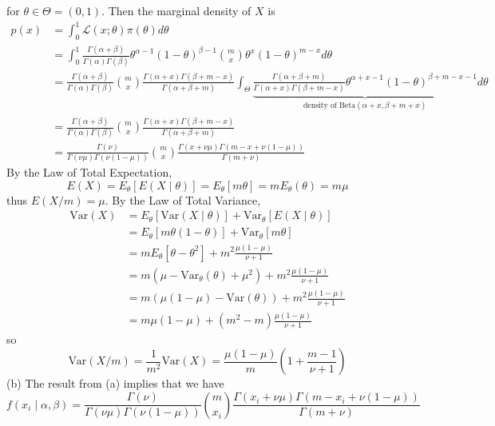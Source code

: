 \documentclass[12pt]{article}
\newcommand{\1}{\mathds 1}
\newcommand{\Var}{\text{Var}}
\begin{document}
\begin{enumerate}
{\begin{equation*}
\end{equation*}
for $\theta \in \Theta = (0, 1)$. 
Then the marginal density of $X$ is 
\small
\begin{align*}
    p(x) &= \int_0^1 \mathcal L(x ; \theta)\pi(\theta) d\theta\\
    &= \int_0^1 \frac{\Gamma(\alpha+\beta)}{\Gamma(\alpha)\Gamma(\beta)} \theta^{\alpha-1}(1-\theta)^{\beta-1} \binom mx \theta^x (1-\theta)^{m-x} d\theta\\
    &= \frac{\Gamma(\alpha+\beta)}{\Gamma(\alpha)\Gamma(\beta)}\binom mx \frac{\Gamma(\alpha+x)\Gamma(\beta+m-x)}{\Gamma(\alpha+\beta+m)} \int_{\Theta}\underbrace{\frac{\Gamma(\alpha+\beta+m)}{\Gamma(\alpha+x)\Gamma(\beta+m-x)} \theta^{\alpha+x-1}(1-\theta)^{\beta+m-x-1}}_{\text{density of Beta}(\alpha+x, \beta+m+x)}d\theta\\
    &= \frac{\Gamma(\alpha+\beta)}{\Gamma(\alpha)\Gamma(\beta)} \binom mx \frac{\Gamma(\alpha+x)\Gamma(\beta+m-x)}{\Gamma(\alpha+\beta+m)}\\
    &= \frac{\Gamma(\nu)}{\Gamma(\nu\mu)\Gamma(\nu(1-\mu))}\binom mx \frac{\Gamma(x+\nu\mu)\Gamma(m-x + \nu(1-\mu))}{\Gamma(m + \nu)}
\end{align*}
\normalsize
By the Law of Total Expectation, 
\begin{equation*}
    E(X) = E_\theta[E(X \mid \theta)] = E_\theta[m\theta] = mE_\theta(\theta) = m \mu
\end{equation*}
thus $E(X / m) = \mu$. By the Law of Total Variance, 
\begin{align*}
    \Var(X) &= E_\theta[\Var(X \mid \theta)] + \Var_\theta[E(X \mid \theta)]\\
    &= E_\theta[m\theta(1-\theta)] + \Var_\theta[m\theta]\\
    &= mE_\theta[\theta - \theta^2] + m^2\frac{\mu(1-\mu)}{\nu + 1}\\
    &= m(\mu - \Var_\theta(\theta) + \mu^2) + m^2\frac{\mu(1-\mu)}{\nu + 1}\\
    &= m(\mu(1-\mu) - \Var(\theta)) + m^2\frac{\mu(1-\mu)}{\nu + 1}\\
    &= m\mu(1-\mu) + (m^2 - m) \frac{\mu(1-\mu)}{\nu + 1}
\end{align*}
so 
\begin{equation*}
    \Var(X/m) = \frac{1}{m^2} \Var(X) = \frac{\mu(1-\mu)}{m}\left( 1 + \frac{m-1}{\nu + 1}\right)
\end{equation*}
(b) The result from (a) implies that we have 
\begin{equation*}
    f(x_i \mid \alpha, \beta) = \frac{\Gamma(\nu)}{\Gamma(\nu\mu)\Gamma(\nu(1-\mu))}\binom{m}{x_i} \frac{\Gamma(x_i+\nu\mu)\Gamma(m-x_i + \nu(1-\mu))}{\Gamma(m + \nu)}

\end{equation*}}
\end{enumerate}
\end{document}
